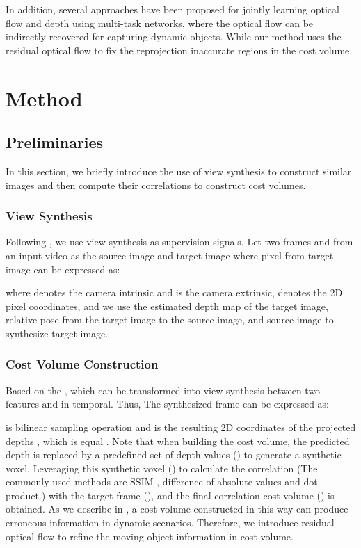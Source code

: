 \documentclass[journal]{IEEEtran}
\begin{document}
In addition, several approaches have been proposed for jointly learning optical flow and depth using multi-task networks\cite{yang2018every, hur2020self, hur2021self, liu2019unsupervised, yin2018geonet}, where the optical flow can be indirectly recovered for capturing dynamic objects. While our method uses the residual optical flow to fix the reprojection inaccurate regions in the cost volume.

\section{Method}
\subsection{Preliminaries}
In this section, we briefly introduce the use of view synthesis to construct similar images and then compute their correlations to construct cost volumes.

\subsubsection{View Synthesis}
Following \cite{monodepth2,manydepth}, we use view synthesis as supervision signals. Let two frames  and  from an input video as the source image and target image where pixel from target image can be expressed as:

where  denotes the camera intrinsic and  is the camera extrinsic,  denotes the 2D pixel coordinates, and we use the estimated depth map of the target image, relative pose from the target image to the source image, and source image to synthesize target image.

\subsubsection{Cost Volume Construction}
Based on the , which can be transformed into view synthesis between two features  and  in temporal. Thus, The synthesized frame  can be expressed as:

 is bilinear sampling operation and  is the resulting 2D coordinates of the projected depths , which is equal . Note that when building the cost volume, the predicted depth is replaced by a predefined set of depth values () to generate a synthetic voxel. Leveraging this synthetic voxel () to calculate the correlation (The commonly used methods are SSIM \cite{wang2004image}, difference of absolute values and dot product.) with the target frame (), and the final correlation cost volume () is obtained. As we describe in , a cost volume constructed in this way can produce erroneous information in dynamic scenarios. Therefore, we introduce residual optical flow to refine the moving object information in cost volume.
\end{document}
